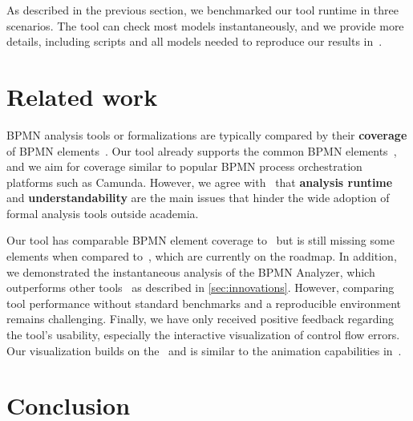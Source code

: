 \documentclass[
twocolumn
]{ceurart}
\begin{document}
As described in the previous section, we benchmarked our tool runtime in three scenarios.
The tool can check most models instantaneously, and we provide more details, including scripts and all models needed to reproduce our results in~\cite{krauterInstantaneousComprehensibleFixable2024}.

\section{Related work} \label{sec:related-work}

BPMN analysis tools or formalizations are typically compared by their \textbf{coverage} of BPMN elements~\cite{krauterHigherorderTransformationApproach2024,krauterFormalizationAnalysisBPMN2023,corradiniFormalApproachAnalysis2021,houhouFirstOrderLogicVerification2022,houhouFirstOrderLogicSemantics2019}.
Our tool already supports the common BPMN elements~\cite{krauterInstantaneousComprehensibleFixable2024}, and we aim for coverage similar to popular BPMN process orchestration platforms such as Camunda.
However, we agree with~\cite{fahlandAnalysisDemandInstantaneous2011} that \textbf{analysis runtime} and \textbf{understandability} are the main issues that hinder the wide adoption of formal analysis tools outside academia.

Our tool has comparable BPMN element coverage to~\cite{corradiniFormalApproachAnalysis2021} but is still missing some elements when compared to~\cite{krauterFormalizationAnalysisBPMN2023}, which are currently on the roadmap. 
In addition, we demonstrated the instantaneous analysis of the BPMN Analyzer, which outperforms other tools~\cite{krauterFormalizationAnalysisBPMN2023,corradiniFormalApproachAnalysis2021,houhouFirstOrderLogicVerification2022} as described in \autoref{sec:innovations}.
However, comparing tool performance without standard benchmarks and a reproducible environment remains challenging.
Finally, we have only received positive feedback regarding the tool's usability, especially the interactive visualization of control flow errors.
Our visualization builds on the~\cite{camundaservicesgmbhBpmnjsTokenSimulation2024} and is similar to the animation capabilities in~\cite{corradiniFormalisingAnimatingMultiple2022}.


\section{Conclusion} \label{sec:conclusion}
\end{document}
